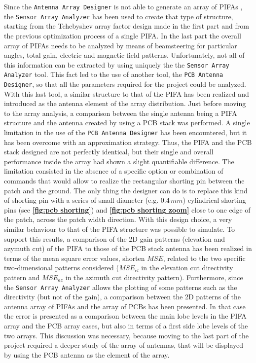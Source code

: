 \documentclass[10pt,a4paper,twocolumn]{article}
\begin{document}
{Since the \texttt{\color{Mahogany}Antenna Array Designer} is not able to generate an array of PIFAs , the \texttt{\color{Mahogany}Sensor Array Analyzer} has been used to create that type of structure, starting from the Tchebyshev array factor design made in the first part and from the previous optimization process of a single PIFA. In the last part the overall array of PIFAs needs to be analyzed by means of beamsteering for particular angles, total gain, electric and magnetic field patterns. Unfortunately, not all of this information can be extracted by using uniquely the the \texttt{\color{Mahogany}Sensor Array Analyzer} tool. This fact led to the use of another tool, the \texttt{\color{Mahogany}PCB Antenna Designer}, so that all the parameters required for the project could be analyzed. With this last tool, a similar structure to that of the PIFA has been realized and introduced as the antenna element of the array distribution. Just before moving to the array analysis, a comparison between the single antenna being a PIFA structure and the antenna created by using a PCB stack was performed. A single limitation in the use of the \texttt{\color{Mahogany}PCB Antenna Designer} has been encountered, but it has been overcome with an approximation strategy. Thus, the PIFA and the PCB stack designed are not perfectly identical, but their single and overall performance inside the array had shown a slight quantifiable difference. The limitation consisted in the absence of a specific option or combination of commands that would allow to realize the rectangular shorting pin between the patch and the ground. The only thing the designer can do is to replace this kind of shorting pin with a series of small diameter (e.g. $0.4\,mm$) cylindrical shorting pins (see \textbf{\cref{fig:pcb shorting}}) and \textbf{\cref{fig:pcb shorting zoom}} close to one edge of the patch, across the patch width direction. With this design choice, a very similar behaviour to that of the PIFA structure was possible to simulate. To support this results, a comparison of the 2D gain patterns (elevation and azymuth cut) of the PIFA to those of the PCB stack antenna has been realized in terms of the mean square error values, shorten $MSE$, related to the two specific two-dimensional patterns considered ($MSE_{el}$ in the elevation cut directivity pattern and $MSE_{az}$ in the azimuth cut directivity pattern). Furthermore, since the \texttt{\color{Mahogany}Sensor Array Analyzer} allows the plotting of some patterns such as the directivity (but not of the gain), a comparison between the 2D patterns of the antenna array of PIFAs and the array of PCBs has been presented. In that case the error is presented as a comparison between the main lobe levels in the PIFA array and the PCB array cases, but also in terms of a first side lobe levels of the two arrays. This discussion was necessary, because moving to the last part of the project required a deeper study of the array of antennas, that will be displayed by using the PCB antenna as the element of the array. 

}
\end{document}
